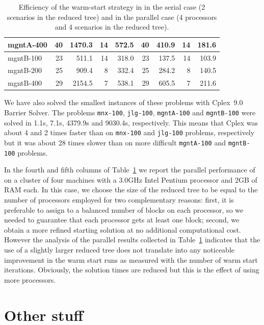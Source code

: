 \begin{table}[ht]
\begin{center}
\begin{tabular}{|l||rr|rr||rr|rr|}
mgntA-400     &   40 & 1470.3 &   14 &  572.5 &  40 &  410.9 &  14 &  181.6 \\
\hline
mgntB-100     &   23 &  511.1 &   14 &  318.0 &  23 &  137.5 &  14 &  103.9 \\
mgntB-200     &   25 &  909.4 &    8 &  332.4 &  25 &  284.2 &   8 &  140.5 \\
mgntB-400     &   29 & 2154.5 &    7 &  538.1 &  29 &  605.5 &   7 &  211.6 \\
\hline
    \end{tabular}
    \caption{Efficiency of the warm-start strategy in \OOPS in the serial
             case (2 scenarios in the reduced tree) and in the parallel case
	     (4 processors and 4 scenarios in the reduced tree).}
    \label{table:oops}
  \end{center} \vspace{-3ex}
\end{table}


We have also solved the smallest instances of these problems 
with Cplex~9.0 Barrier Solver. The problems 
{\tt mnx-100}, {\tt jlg-100}, {\tt mgntA-100} and {\tt mgntB-100} 
were solved in 1.1s, 7.1s, 4379.9s and 9030.4s, respectively.
This means that Cplex was about 4 and 2 times faster than \OOPS
on {\tt mnx-100} and {\tt jlg-100} problems, respectively 
but it was about 28 times slower than \OOPS on more difficult
{\tt mgntA-100} and {\tt mgntB-100} problems.

In the fourth and fifth columns of Table~\ref{table:oops} 
we report the parallel performance 
of \OOPS on a cluster of four machines with a 3.0GHz Intel Pentium 
processor and 2GB of RAM each.
In this case, we choose the size of the reduced tree to be equal 
to the number of processors employed for two complementary reasons: 
first, it is preferable to assign to \OOPS a balanced number of blocks 
on each processor, so we needed to guarantee that each processor 
gets at least one block; second, we obtain a more refined 
starting solution at no additional computational cost. 
However the analysis of the parallel results collected 
in Table~\ref{table:oops}
indicates that the use of a slightly larger reduced tree does not 
translate into any noticeable improvement in the warm start runs 
as measured with the number of warm start iterations.
Obviously, the solution times are reduced but this is the effect 
of using more processors.

%
%
\section{Other stuff}

